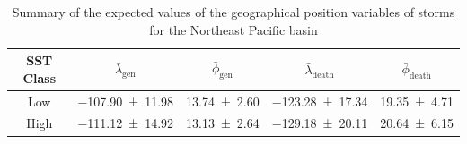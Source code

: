 \begin{table}[H]
	\centering
	\begin{tabular}{c cc cc}
	\toprule
	\toprule
	SST Class & $\bar{\lambda}_{\text{gen}}$   & $\bar{\phi}_{\text{gen}}$
	          & $\bar{\lambda}_{\text{death}}$ & $\bar{\phi}_{\text{death}}$ \\
	\midrule
	Low       & \num{-107.90 \pm 11.98} & \num{13.74 \pm 2.60} & \num{-123.28 \pm 17.34} & \num{19.35 \pm 4.71} \\
	High      & \num{-111.12 \pm 14.92} & \num{13.13 \pm 2.64} & \num{-129.18 \pm 20.11} & \num{20.64 \pm 6.15} \\
	\bottomrule
	\end{tabular}
	\caption{Summary of the expected values of the geographical position variables of storms for the Northeast Pacific basin}
	\label{tab:epac-positions}
\end{table}

\bigskip
